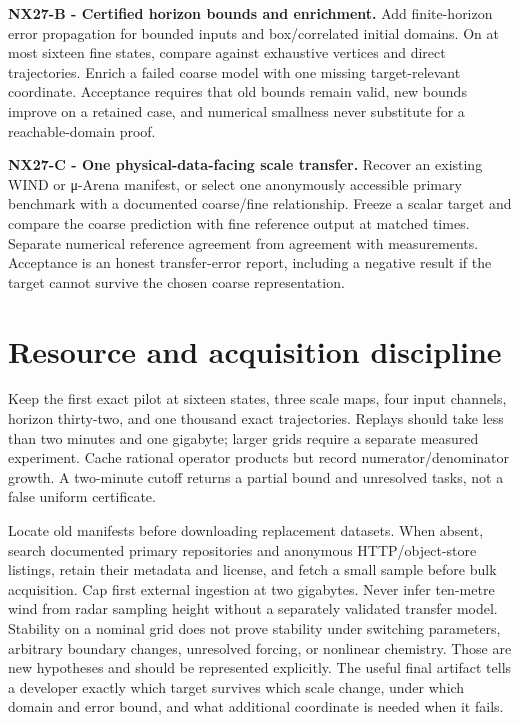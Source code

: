 \documentclass[
  11pt,
  a4paper,
]{report}
\begin{document}
\textbf{NX27-B - Certified horizon bounds and enrichment.} Add
finite-horizon error propagation for bounded inputs and box/correlated
initial domains. On at most sixteen fine states, compare against
exhaustive vertices and direct trajectories. Enrich a failed coarse
model with one missing target-relevant coordinate. Acceptance requires
that old bounds remain valid, new bounds improve on a retained case, and
numerical smallness never substitute for a reachable-domain proof.

\textbf{NX27-C - One physical-data-facing scale transfer.} Recover an
existing WIND or μ-Arena manifest, or select one anonymously accessible
primary benchmark with a documented coarse/fine relationship. Freeze a
scalar target and compare the coarse prediction with fine reference
output at matched times. Separate numerical reference agreement from
agreement with measurements. Acceptance is an honest transfer-error
report, including a negative result if the target cannot survive the
chosen coarse representation.

\hypertarget{resource-and-acquisition-discipline}{%
\section{Resource and acquisition
discipline}\label{resource-and-acquisition-discipline}}

Keep the first exact pilot at sixteen states, three scale maps, four
input channels, horizon thirty-two, and one thousand exact trajectories.
Replays should take less than two minutes and one gigabyte; larger grids
require a separate measured experiment. Cache rational operator products
but record numerator/denominator growth. A two-minute cutoff returns a
partial bound and unresolved tasks, not a false uniform certificate.

Locate old manifests before downloading replacement datasets. When
absent, search documented primary repositories and anonymous
HTTP/object-store listings, retain their metadata and license, and fetch
a small sample before bulk acquisition. Cap first external ingestion at
two gigabytes. Never infer ten-metre wind from radar sampling height
without a separately validated transfer model. Stability on a nominal
grid does not prove stability under switching parameters, arbitrary
boundary changes, unresolved forcing, or nonlinear chemistry. Those are
new hypotheses and should be represented explicitly. The useful final
artifact tells a developer exactly which target survives which scale
change, under which domain and error bound, and what additional
coordinate is needed when it fails.
\end{document}
